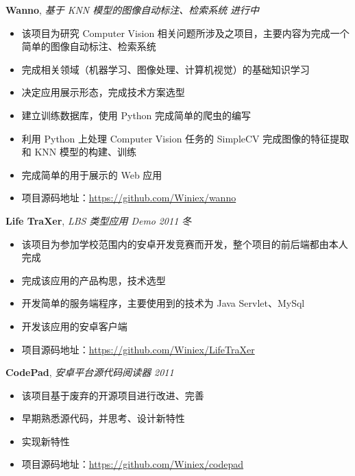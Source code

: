 \documentclass[9pt]{ctexart}
\newenvironment{changemargin}[2]{%
    \begin{list}{}{%
            \setlength{\topsep}{0pt}%
            \setlength{\leftmargin}{#1}%
            \setlength{\rightmargin}{#2}%
            \setlength{\listparindent}{\parindent}%
        \setlength{\itemindent}{\parindent}%
            \setlength{\parsep}{\parskip}%
        }%
  \item[]}{\end{list}
      }
\newenvironment{body} {
          \vspace*{-16pt}
          \begin{changemargin}{-0.25in}{-0.5in}
          }	
      {\end{changemargin}
      }
\begin{document}
      \begin{body}
          \vspace{14pt}
          \textbf{Wanno}, \emph{基于 KNN 模型的图像自动标注、检索系统} \hfill \emph{进行中}\\
          \vspace*{-4pt}
      \begin{itemize} \itemsep -0pt  %
              \item 该项目为研究 Computer Vision 相关问题所涉及之项目，主要内容为完成一个简单的图像自动标注、检索系统
              \item 完成相关领域（机器学习、图像处理、计算机视觉）的基础知识学习
              \item 决定应用展示形态，完成技术方案选型
              \item 建立训练数据库，使用 Python 完成简单的爬虫的编写
              \item 利用 Python 上处理 Computer Vision 任务的 SimpleCV 完成图像的特征提取和 KNN 模型的构建、训练
              \item 完成简单的用于展示的 Web 应用
             \item 项目源码地址：\url{https://github.com/Winiex/wanno}
          \end{itemize}

          \newpage

          \textbf{Life TraXer}, \emph{LBS 类型应用 Demo} \hfill \emph{2011 冬}\\
          \vspace*{-4pt}
      \begin{itemize} \itemsep -0pt  %
              \item 该项目为参加学校范围内的安卓开发竞赛而开发，整个项目的前后端都由本人完成
              \item 完成该应用的产品构思，技术选型
              \item 开发简单的服务端程序，主要使用到的技术为 Java Servlet、MySql
              \item 开发该应用的安卓客户端
              \item 项目源码地址：\url{https://github.com/Winiex/LifeTraXer}
          \end{itemize}

          \textbf {CodePad}, \emph{安卓平台源代码阅读器} \hfill \emph{2011}\\
          \vspace*{-4pt}
      \begin{itemize} \itemsep -0pt
              \item 该项目基于废弃的开源项目进行改进、完善
              \item 早期熟悉源代码，并思考、设计新特性
              \item 实现新特性
              \item 项目源码地址：\url{https://github.com/Winiex/codepad}
          \end{itemize}


\end{body}
\end{document}
